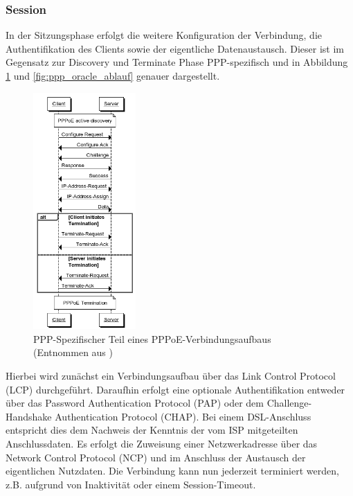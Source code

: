 \documentclass[journal,11pt]{IEEEtran}
\begin{document}
\subsubsection{Session}
In der Sitzungsphase erfolgt die weitere Konfiguration der Verbindung, die Authentifikation des
Clients sowie der eigentliche Datenaustausch. Dieser ist im Gegensatz zur Discovery und Terminate
Phase PPP-spezifisch und in Abbildung \ref{fig:ppp_startnetworks} und \ref{fig:ppp_oracle_ablauf} genauer dargestellt.
%
\begin{figure}[h!]
 \centering
  \includegraphics[width=0.35\textwidth]{img/pppoe_sequenz2.png}
 \caption{PPP-Spezifischer Teil eines PPPoE-Verbindungsaufbaus (Entnommen aus \cite{ppp_startnetworks})}
 \label{fig:ppp_startnetworks}
\end{figure}
%
Hierbei wird zunächst ein Verbindungsaufbau über das Link Control Protocol (LCP) durchgeführt.
Daraufhin erfolgt eine optionale Authentifikation entweder über das Password Authentication Protocol (PAP)
oder dem Challenge-Handshake Authentication Protocol (CHAP). Bei einem DSL-Anschluss entspricht dies
dem Nachweis der Kenntnis der vom ISP mitgeteilten Anschlussdaten. Es erfolgt die Zuweisung einer
Netzwerkadresse über das Network Control Protocol (NCP) und im Anschluss der Austausch der
eigentlichen Nutzdaten. Die Verbindung kann nun jederzeit terminiert werden, z.B.
aufgrund von Inaktivität oder einem Session-Timeout.
%
%
\end{document}
